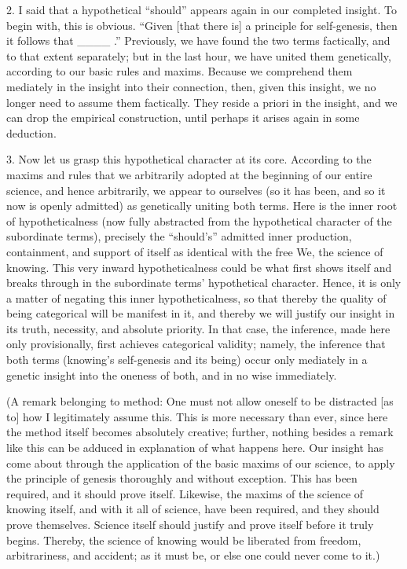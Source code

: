 2. I said that a hypothetical “should” appears
again in our completed insight.
To begin with, this is obvious.
“Given [that there is] a principle
for self-genesis, then it follows that ____ .”
Previously, we have found the two terms factically,
and to that extent separately;
but in the last hour, we have united them genetically,
according to our basic rules and maxims.
Because we comprehend them mediately
in the insight into their connection,
then, given this insight,
we no longer need to assume them factically.
They reside a priori in the insight,
and we can drop the empirical construction,
until perhaps it arises again in some deduction.

3. Now let us grasp this hypothetical character at its core.
According to the maxims and rules that we arbitrarily adopted
at the beginning of our entire science, and hence arbitrarily,
we appear to ourselves
(so it has been, and so it now is openly admitted)
as genetically uniting both terms.
Here is the inner root of hypotheticalness
(now fully abstracted from the hypothetical
character of the subordinate terms),
precisely the “should's” admitted
inner production, containment, and support of itself
as identical with the free We, the science of knowing.
This very inward hypotheticalness could be
what first shows itself and breaks through
in the subordinate terms' hypothetical character.
Hence, it is only a matter of
negating this inner hypotheticalness,
so that thereby the quality of being categorical
will be manifest in it,
and thereby we will justify our insight
in its truth, necessity, and absolute priority.
In that case, the inference,
made here only provisionally,
first achieves categorical validity;
namely, the inference that both terms
(knowing's self-genesis and its being)
occur only mediately in a genetic insight
into the oneness of both,
and in no wise immediately.

(A remark belonging to method:
One must not allow oneself to be distracted
[as to] how I legitimately assume this.
This is more necessary than ever,
since here the method itself becomes absolutely creative;
further, nothing besides a remark like this
can be adduced in explanation of what happens here.
Our insight has come about through
the application of the basic maxims of our science,
to apply the principle of genesis
thoroughly and without exception.
This has been required,
and it should prove itself.
Likewise, the maxims of the science of knowing itself,
and with it all of science, have been required,
and they should prove themselves.
Science itself should justify
and prove itself before it truly begins.
Thereby, the science of knowing would be liberated
from freedom, arbitrariness, and accident;
as it must be, or else one could never come to it.)


